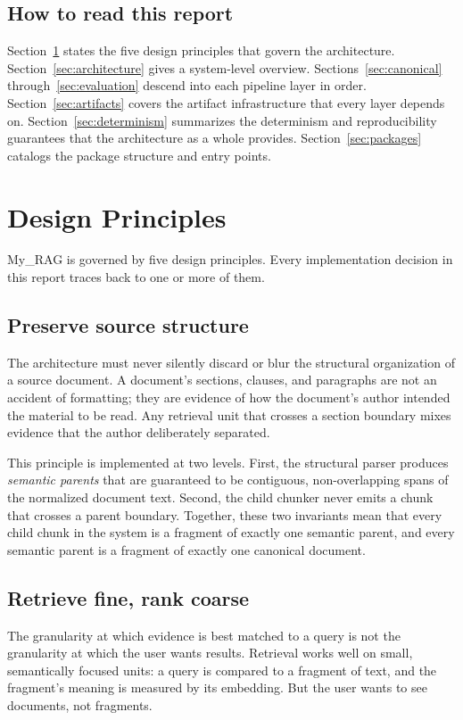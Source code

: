 \documentclass[11pt,a4paper]{article}
\begin{document}
\subsection{How to read this report}
Section~\ref{sec:principles} states the five design principles that
govern the architecture. Section~\ref{sec:architecture} gives a
system-level overview. Sections~\ref{sec:canonical}
through~\ref{sec:evaluation} descend into each pipeline layer in
order. Section~\ref{sec:artifacts} covers the artifact infrastructure
that every layer depends on. Section~\ref{sec:determinism}
summarizes the determinism and reproducibility guarantees that the
architecture as a whole provides. Section~\ref{sec:packages}
catalogs the package structure and entry points.

\section{Design Principles}\label{sec:principles}

My\_RAG is governed by five design principles. Every implementation
decision in this report traces back to one or more of them.

\subsection{Preserve source structure}
The architecture must never silently discard or blur the structural
organization of a source document. A document's sections, clauses,
and paragraphs are not an accident of formatting; they are evidence
of how the document's author intended the material to be read. Any
retrieval unit that crosses a section boundary mixes evidence that
the author deliberately separated.

This principle is implemented at two levels. First, the structural
parser produces \emph{semantic parents} that are guaranteed to be
contiguous, non-overlapping spans of the normalized document text.
Second, the child chunker never emits a chunk that crosses a parent
boundary. Together, these two invariants mean that every child chunk
in the system is a fragment of exactly one semantic parent, and every
semantic parent is a fragment of exactly one canonical document.

\subsection{Retrieve fine, rank coarse}
The granularity at which evidence is best matched to a query is not
the granularity at which the user wants results. Retrieval works
well on small, semantically focused units: a query is compared to a
fragment of text, and the fragment's meaning is measured by its
embedding. But the user wants to see documents, not fragments.
\end{document}
